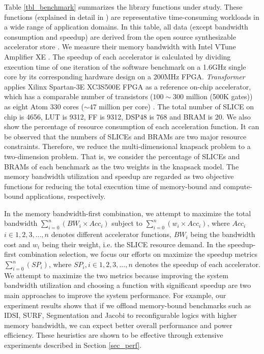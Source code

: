 Table \ref{tbl_benchmark} summarizes the library functions under
study. These functions (explained in detail in \cite{accstore}) are
representative time-consuming workloads in a wide range of application
domains.  In this table, all data (except bandwidth consumption and
speedup) are derived from the open source synthesizable accelerator
store \cite{accstore}. We measure their memory bandwidth with Intel
VTune Amplifier XE \cite{vtune}. The speedup of each accelerator is
calculated by dividing execution time of one iteration of the software
benchmark on a 1.6GHz single core by its corresponding hardware design
on a 200MHz FPGA. {\em Transformer} applies Xilinx Spartan-3E XC3S500E
FPGA \cite{spartan3e} as a reference on-chip accelerator, which has a
comparable number of transistors ({$100\sim300$ million (500K gates)})
as eight Atom 330 cores ({$\sim 47$ million per core})
\cite{atom-spec}. The total number of SLICE on chip is 4656, LUT is
9312, FF is 9312, DSP48 is 768 and BRAM is 20. We also show the
percentage of resource consumption of each acceleration function. It
can be observed that the numbers of SLICEs and BRAMs are two major
resource constraints.  Therefore, we reduce the multi-dimensional
knapsack problem to a two-dimension problem. That is, we consider the
percentage of SLICEs and BRAMs of each benchmark as the two weights in
the knapsack model. The memory bandwidth utilization and speedup are
regarded as two objective functions for reducing the total execution
time of memory-bound and compute-bound applications, respectively.

In the memory bandwidth-first combination, we attempt to maximize the
total bandwidth $\sum_{i=0}^{n}(BW_i \times Acc_i) $ subject to
$\sum_{i=0}^{n}(w_i \times Acc_i) $, where $Acc_i$ $i \in {1,2,3,
  ... ,n}$ denotes different accelerator functions, $BW_i$ being the
bandwidth cost and $w_i$ being their weight, i.e. the SLICE resource
demand. In the speedup-first combination selection, we focus our
efforts on maximize the speedup metrics $\sum_{i=0}^{n}(SP_i) $, where
$SP_i , i \in {1,2,3, \ldots, n}$ denotes the speedup of each
accelerator. We attempt to maximize the two metrics because improving
the system bandwidth utilization and choosing a function with
significant speedup are two main approaches to improve the system
performance. For example, our experiment results shows that if we
offload memory-bound benchmarks such as IDSI, SURF, Segmentation and
Jacobi to reconfigurable logics with higher memory bandwidth, we can
expect better overall performance and power efficiency. These
heuristics are shown to be effective through extensive experiments
described in Section \ref{sec_perf}.

